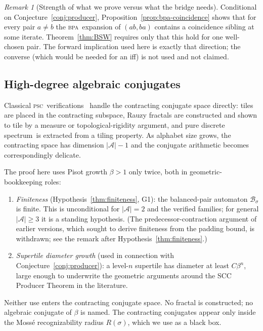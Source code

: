 \documentclass[11pt]{article}
\theoremstyle{plain}
\theoremstyle{definition}
\theoremstyle{remark}
\newtheorem{remark}[theorem]{Remark}
\newcommand{\PSC}{\textsc{psc}}
\newcommand{\BPA}{\textsc{bpa}}
\newcommand{\PDS}{pure discrete spectrum}
\newcommand{\A}{\mathcal{A}}
\newcommand{\B}{\mathcal{B}}
\begin{document}
\begin{remark}[Strength of what we prove versus what the bridge needs]\label{rem:overprove}
Conditional on Conjecture~\ref{conj:producer}, Proposition~\ref{prop:bpa-coincidence} shows that for every pair $a\ne b$ the \BPA\ expansion of $(ab,ba)$ contains a coincidence sibling at some iterate. Theorem~\ref{thm:BSW} requires only that this hold for one well-chosen pair. The forward implication used here is exactly that direction; the converse (which would be needed for an iff) is not used and not claimed.
\end{remark}

\subsection{High-degree algebraic conjugates}\label{sec:high-degree}

Classical \PSC\ verifications~\cite{HS,IR,BK,Barge2016,Barge2018} handle the contracting conjugate space directly: tiles are placed in the contracting subspace, Rauzy fractals are constructed and shown to tile by a measure or topological-rigidity argument, and \PDS\ is extracted from a tiling property. As alphabet size grows, the contracting space has dimension $|\A|-1$ and the conjugate arithmetic becomes correspondingly delicate.

The proof here uses Pisot growth $\beta>1$ only twice, both in geometric-bookkeeping roles:
\begin{enumerate}[label=(\roman*)]
\item \emph{Finiteness} (Hypothesis~\ref{thm:finiteness}, G1): the balanced-pair automaton $\B_\sigma$ is finite. This is unconditional for $|\A|=2$ and the verified families; for general $|\A|\ge3$ it is a standing hypothesis. (The predecessor-contraction argument of earlier versions, which sought to derive finiteness from the padding bound, is withdrawn; see the remark after Hypothesis~\ref{thm:finiteness}.)
\item \emph{Supertile diameter growth} (used in connection with Conjecture~\ref{conj:producer}): a level-$n$ supertile has diameter at least $C\beta^n$, large enough to underwrite the geometric arguments around the SCC Producer Theorem in the literature.
\end{enumerate}

Neither use enters the contracting conjugate space. No fractal is constructed; no algebraic conjugate of $\beta$ is named. The contracting conjugates appear only inside the Moss\'e recognizability radius $R(\sigma)$, which we use as a black box.
\end{document}
